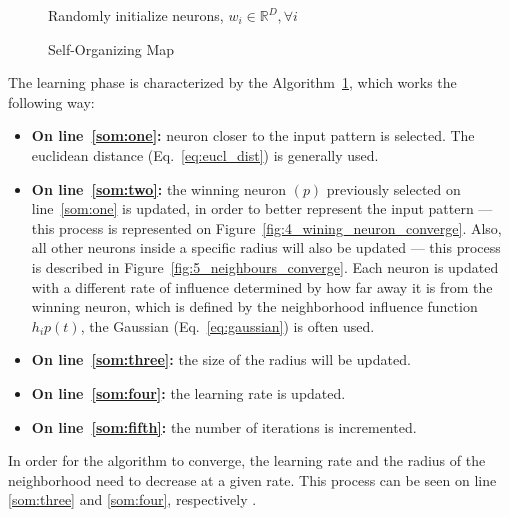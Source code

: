 \begin{figure}[h]
  \begin{algorithm}[H]
    \label{alg:som}
    \DontPrintSemicolon
    Randomly initialize neurons, $w_i \in \mathbb{R}^{D}, \forall i $ \;
      \caption{Self-Organizing Map \cite[]{Kohonen1990} }
  \end{algorithm}
\end{figure}

The learning phase is characterized by the Algorithm~\ref{alg:som}, which works the following way:
\begin{itemize}
  \item \textbf{On line~\ref{som:one}:} neuron closer to the input pattern is selected. The euclidean distance (Eq.~\ref{eq:eucl_dist}) is generally used.
    
  \item \textbf{On line~\ref{som:two}:} the winning neuron $(p)$ previously selected on line~\ref{som:one} is updated, in order to better represent the input pattern --- this process is represented on Figure~\ref{fig:4_wining_neuron_converge}. Also, all other neurons inside a specific radius will also be updated --- this process is described in Figure~\ref{fig:5_neighbours_converge}. Each neuron is updated with a different rate of influence determined by how far away it is from the winning neuron, which is defined by the neighborhood influence function $h_ip(t)$, the Gaussian (Eq.~\ref{eq:gaussian}) is often used. 
    
  \item \textbf{On line~\ref{som:three}:} the size of the radius will be updated.
  \item \textbf{On line~\ref{som:four}:} the learning rate is updated.
  \item \textbf{On line~\ref{som:fifth}:} the number of iterations is incremented.
\end{itemize}
 
In order for the algorithm to converge, the learning rate and the radius of the neighborhood need to decrease at a given rate. This process can be seen on line \ref{som:three} and \ref{som:four}, respectively .
